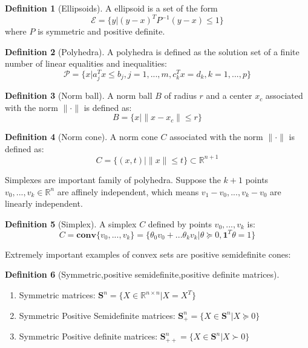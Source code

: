\documentclass[
]{book}
\providecommand{\tightlist}{%
  \setlength{\itemsep}{0pt}\setlength{\parskip}{0pt}}
\theoremstyle{definition}
\newtheorem{definition}{Definition}[chapter]
\theoremstyle{definition}
\theoremstyle{definition}
\theoremstyle{definition}
\theoremstyle{remark}
\begin{document}
\begin{definition}[Ellipsoids]
\protect\hypertarget{def:ellipsoids}{}\label{def:ellipsoids}A ellipsoid is a set of the form \[\mathcal{E} = \{y|(y-x)^TP^{-1}(y-x)\leq 1\}\]
where \(P\) is symmetric and positive definite.
\end{definition}

\begin{definition}[Polyhedra]
\protect\hypertarget{def:polyhedra}{}\label{def:polyhedra}A polyhedra is defined as the solution set of a finite number of linear equalities
and inequalities: \[\mathcal{P} = \{x|a_j^Tx\leq b_j, j=1,...,m, c_k^Tx=d_k,k=1,...,p\}\]
\end{definition}

\begin{definition}[Norm ball]
\protect\hypertarget{def:normball}{}\label{def:normball}A norm ball \(B\) of radius \(r\) and a center \(x_c\) associated with the norm \(\|\cdot\|\) is defined as: \[B = \{x|\|x-x_c\|\leq r\}\]
\end{definition}

\begin{definition}[Norm cone]
\protect\hypertarget{def:normcone}{}\label{def:normcone}A norm cone \(C\) associated with the norm \(\|\cdot\|\) is defined as: \[C = \{(x,t)|\|x\|\leq t\}\subset \mathbb{R}^{n+1}\]
\end{definition}

Simplexes are important family of polyhedra. Suppose the \(k+1\) points \(v_0,...,v_k\in \mathbb{R}^n\) are affinely independent, which means \(v_1-v_0,...,v_k-v_0\) are linearly independent.

\begin{definition}[Simplex]
\protect\hypertarget{def:simplex}{}\label{def:simplex}A simplex \(C\) defined by points \(v_0,...,v_k\) is: \[C = \textbf{conv}\{v_0,...,v_k\} = \{\theta_0v_0 + ... \theta_kv_k|\theta \succeq 0, \textbf{1}^T\theta = 1\}\]
\end{definition}

Extremely important examples of convex sets are positive semidefinite cones:

\begin{definition}[Symmetric,positive semidefinite,positive definite matrices]
\protect\hypertarget{def:symmetricmatrices}{}\label{def:symmetricmatrices}\leavevmode

\begin{enumerate}
\def\labelenumi{\arabic{enumi}.}
\tightlist
\item
  Symmetric matrices: \(\textbf{S}^n = \{X\in\mathbb{R}^{n\times n}| X=X^T\}\)
\item
  Symmetric Positive Semidefinite matrices: \(\textbf{S}_+^n = \{X\in\textbf{S}^n| X\succeq0\}\)
\item
  Symmetric Positive definite matrices: \(\textbf{S}_{++}^n = \{X\in\textbf{S}^n| X\succ0\}\)
\end{enumerate}

\end{definition}
\end{document}
